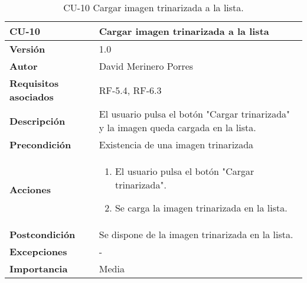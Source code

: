 \begin{table}[p]
	\centering
	\begin{tabularx}{\linewidth}{ p{} p{} }
		\toprule
		\textbf{CU-10}    & \textbf{Cargar imagen trinarizada a la lista}\\
		\toprule
		\textbf{Versión}              & 1.0    \\
		\textbf{Autor}                & David Merinero Porres \\
		\textbf{Requisitos asociados} & RF-5.4, RF-6.3 \\
		\textbf{Descripción}          & El usuario pulsa el botón "Cargar trinarizada" y la imagen queda cargada en la lista. \\
		\textbf{Precondición}         &  Existencia  de una imagen trinarizada \\
		\textbf{Acciones}             &
		\begin{enumerate}
			\def\labelenumi{\arabic{enumi}.}
			\tightlist
			\item El usuario pulsa el botón "Cargar trinarizada".
			\item Se carga la imagen trinarizada en la lista.
		\end{enumerate}\\
		\textbf{Postcondición}        &  Se dispone de la imagen trinarizada en la lista. \\
		\textbf{Excepciones}          & - \\
		\textbf{Importancia}          & Media \\
		\bottomrule
	\end{tabularx}
	\caption{CU-10 Cargar imagen trinarizada a la lista.}
\end{table}


